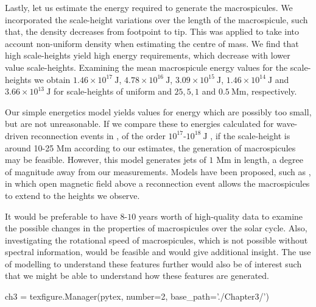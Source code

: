 Lastly, let us estimate the energy required to generate the macrospicules. We incorporated the scale-height variations over the length of the macrospicule, such that, the density decreases from footpoint to tip. This was applied to take into account non-uniform density when estimating the centre of mass. We find that high scale-heights yield high energy requirements, which decrease with lower value scale-heights. Examining the mean macrospicule energy values for the scale-heights we obtain $1.46 \times 10^{17}\ \textrm{J}$, $4.78 \times 10^{16}\ \textrm{J}$,  $3.09 \times 10^{15}\ \textrm{J}$, $1.46 \times 10^{14}\ \textrm{J}$ and $3.66 \times 10^{13}\ \textrm{J}$ for scale-heights of uniform and $25, 5, 1$ and $0.5\ \textrm{Mm}$, respectively.

Our simple energetics model yields values for energy which are possibly too small, but are not unreasonable. If we compare these to energies calculated for wave-driven reconnection events in \cite{Heggland2009}, of the order $10^{17}$-$10^{18}\ \textrm{J}$ , if the scale-height is around 10-25 Mm according to our estimates, the generation of macrospicules may be feasible. However, this model generates jets of $1$ Mm in length, a degree of magnitude away from our measurements. Models have been proposed, such as \cite{Adams2014}, in which open magnetic field above a reconnection event allows the macrospicules to extend to the heights we observe.

It would be preferable to have $8$-$10$ years worth of high-quality data to examine the possible changes in the properties of macrospicules over the solar cycle. Also, investigating the rotational speed of macrospicules, which is not possible without spectral information, would be feasible and would give additional insight. The use of modelling to understand these features further would also be of interest such that we might be able to understand how these features are generated.  



\begin{pycode}[chapter3]
ch3 = texfigure.Manager(pytex, number=2, base_path='./Chapter3/')
\end{pycode}
